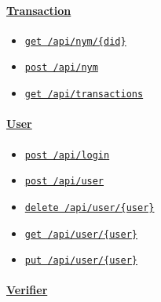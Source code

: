 \hypertarget{transaction}{%
\paragraph{\texorpdfstring{\protect\hyperlink{Transaction}{Transaction}}{Transaction}}\label{transaction}}

\begin{itemize}
\tightlist
\item
  \protect\hyperlink{apiNymDidGet}{\texttt{get\ /api/nym/\{did\}}}
\item
  \protect\hyperlink{apiNymPost}{\texttt{post\ /api/nym}}
\item
  \protect\hyperlink{apiTransactionsGet}{\texttt{get\ /api/transactions}}
\end{itemize}

\hypertarget{user}{%
\paragraph{\texorpdfstring{\protect\hyperlink{User}{User}}{User}}\label{user}}

\begin{itemize}
\tightlist
\item
  \protect\hyperlink{apiLoginPost}{\texttt{post\ /api/login}}
\item
  \protect\hyperlink{apiUserPost}{\texttt{post\ /api/user}}
\item
  \protect\hyperlink{apiUserUserDelete}{\texttt{delete\ /api/user/\{user\}}}
\item
  \protect\hyperlink{apiUserUserGet}{\texttt{get\ /api/user/\{user\}}}
\item
  \protect\hyperlink{apiUserUserPut}{\texttt{put\ /api/user/\{user\}}}
\end{itemize}

\hypertarget{verifier}{%
\paragraph{\texorpdfstring{\protect\hyperlink{Verifier}{Verifier}}{Verifier}}\label{verifier}}

